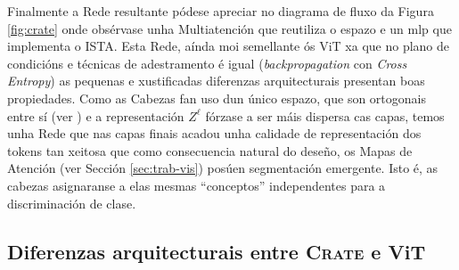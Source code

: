 Finalmente a Rede resultante pódese apreciar no diagrama de fluxo da Figura \ref{fig:crate} onde obsérvase unha Multiatención que reutiliza o espazo e un \acrshort{mlp} que implementa o ISTA. Esta Rede, aínda moi semellante ós ViT xa que no plano de condicións e técnicas de adestramento é igual (\emph{backpropagation} con \emph{Cross Entropy}) as pequenas e xustificadas diferenzas arquitecturais presentan boas propiedades. Como as Cabezas fan uso dun único espazo, que son ortogonais entre sí (ver \cite{crate}) e a representación $Z^{\ell}$ fórzase a ser máis dispersa cas capas, temos unha Rede que nas capas finais acadou unha calidade de representación dos \glspl{token} tan xeitosa que como consecuencia natural do deseño, os Mapas de Atención (ver Sección \ref{sec:trab-vis}) posúen segmentación emergente. Isto é, as cabezas asignaranse a elas mesmas ``conceptos'' independentes para a discriminación de clase.

\subsection{Diferenzas arquitecturais entre \textsc{Crate} e ViT}
\label{sec:diferenzas-crate-vit}

